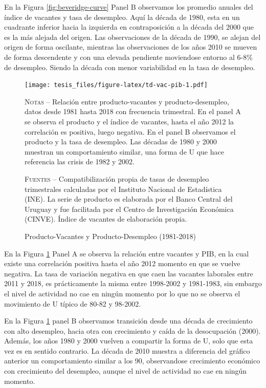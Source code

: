 \documentclass[12pt,oneside]{reedthesis}
\begin{document}
En la Figura \ref{fig:beveridge-curve} Panel B observamos los promedio anuales del índice de vacantes y tasa de desempleo. Aquí la década de 1980, esta en un cuadrante inferior hacia la izquierda en contraposición a la década del 2000 que es la más alejada del origen. Las observaciones de la década de 1990, se alejan del origen de forma oscilante, mientras las observaciones de los años 2010 se mueven de forma descendente y con una elevada pendiente moviendose entorno al 6-8\% de desempleo. Siendo la década con menor variabilidad en la tasa de desempleo.
\begin{figure}
\texttt{[image: tesis\_files/figure-latex/td-vac-pib-1.pdf]}
\caption{Producto-Vacantes y Producto-Desempleo (1981-2018)}\label{fig:td-vac-pib}\textsc{}

\footnotesize\textsc{Notas} -- Relación entre producto-vacantes y producto-desempleo, datos desde 1981 hasta 2018 con frecuencia trimestral. En el panel A se observa el producto y el índice de vacantes, hasta el año 2012 la correlación es positiva, luego negativa. En el panel B observamos el producto y la tasa de desempleo. Las décadas de 1980 y 2000 muestran un comportamiento similar, una forma de U que hace referencia las crisis de 1982 y 2002.

\textsc{Fuentes} -- Compatibilización propia de tasas de desempleo trimestrales calculadas por el Instituto Nacional de Estadística (INE). La serie de producto es elaborada por el Banco Central del Uruguay y fue facilitada por el Centro de Investigación Económica (CINVE). Índice de vacantes de elaboración propia.
\end{figure}
En la Figura \ref{fig:td-vac-pib} Panel A se observa la relación entre vacantes y PIB, en la cual existe una correlación positiva hasta el año 2012 momento en que se vuelve negativa. La tasa de variación negativa en que caen las vacantes laborales entre 2011 y 2018, es prácticamente la misma entre 1998-2002 y 1981-1983, sin embargo el nivel de actividad no cae en ningún momento por lo que no se observa el movimiento de U típico de 80-82 y 98-2002.

En la Figura \ref{fig:td-vac-pib} panel B observamos transición desde una década de crecimiento con alto desempleo, hacia otra con crecimiento y caída de la desocupación (2000). Además, los años 1980 y 2000 vuelven a compartir la forma de U, solo que esta vez es en sentido contrario. La década de 2010 muestra a diferencia del gráfico anterior un comportamiento similar a los 90, observandose crecimiento económico con crecimiento del desempleo, aunque el nivel de actividad no cae en ningún momento.
\end{document}
